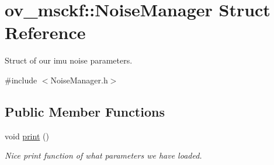 \hypertarget{structov__msckf_1_1NoiseManager}{}\section{ov\+\_\+msckf\+:\+:Noise\+Manager Struct Reference}
\label{structov__msckf_1_1NoiseManager}


Struct of our imu noise parameters.  




{\ttfamily \#include $<$Noise\+Manager.\+h$>$}

\subsection*{Public Member Functions}
\begin{DoxyCompactItemize}
\item 
\mbox{\label{structov__msckf_1_1NoiseManager_a22f023f5dccac5c08d2785e33ec0eeee}} 
void \hyperlink{structov__msckf_1_1NoiseManager_a22f023f5dccac5c08d2785e33ec0eeee}{print} ()
\begin{DoxyCompactList}\small\item\em Nice print function of what parameters we have loaded. \end{DoxyCompactList}\end{DoxyCompactItemize}
